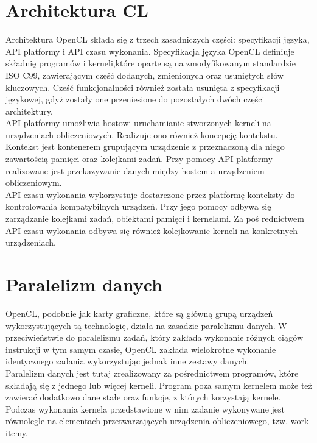 \section{Architektura CL}
Architektura OpenCL składa się z trzech zasadniczych części: specyfikacji języka, API platformy i API czasu wykonania. Specyfikacja języka OpenCL definiuje składnię programów i kerneli,które oparte są na zmodyfikowanym standardzie ISO C99, zawierającym część dodanych, zmienionych oraz usuniętych słów kluczowych. Cześć funkcjonalności również została usunięta z specyfikacji językowej, gdyż zostały one przeniesione do pozostałych dwóch części architektury. \\
API platformy umożliwia hostowi uruchamianie stworzonych kerneli na urządzeniach obliczeniowych. Realizuje ono również koncepcję kontekstu. Kontekst jest kontenerem grupującym urządzenie z przeznaczoną dla niego zawartością pamięci oraz kolejkami zadań. Przy pomocy API platformy realizowane jest przekazywanie danych między hostem a urządzeniem obliczeniowym. \\
API czasu wykonania wykorzystuje dostarczone przez platformę konteksty do kontrolowania kompatybilnych urządzeń. Przy jego pomocy odbywa się zarządzanie kolejkami zadań, obiektami pamięci i kernelami. Za poś rednictwem API czasu wykonania odbywa się również kolejkowanie kerneli na konkretnych urządzeniach.

\section{Paralelizm danych}
OpenCL, podobnie jak karty graficzne, które są główną grupą urządzeń wykorzystujących tą technologię, działa na zasadzie paralelizmu danych. W przeciwieństwie do paralelizmu zadań, który zakłada wykonanie różnych ciągów instrukcji w tym samym czasie, OpenCL zakłada wielokrotne wykonanie identycznego zadania wykorzystując jednak inne zestawy danych. \\
Paralelizm danych jest tutaj zrealizowany za pośrednictwem programów, które składają się z jednego lub więcej kerneli. Program poza samym kernelem może też zawierać dodatkowo dane stałe oraz funkcje, z których korzystają kernele. Podczas wykonania kernela przedstawione w nim zadanie wykonywane jest  równolegle na elementach przetwarzających urządzenia obliczeniowego, tzw. work-itemy. \\

